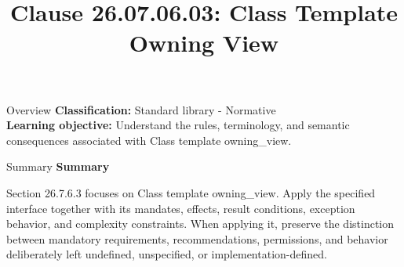 \documentclass[10pt,letterpaper]{article}
\title{Clause 26.07.06.03: Class Template Owning View}
\author{}
\date{}
\begin{document}
\maketitle
\begin{CornellOverviewBox}{Overview}
\textbf{Classification:} Standard library - Normative\\[2pt]
\textbf{Learning objective:} Understand the rules, terminology, and semantic consequences associated with Class template owning\_view.
\end{CornellOverviewBox}\begin{CornellSummaryBox}{Summary}
{\sffamily\bfseries\color{Accent} Summary}\par\vspace{3pt}Section 26.7.6.3 focuses on Class template owning\_view. Apply the specified interface together with its mandates, effects, result conditions, exception behavior, and complexity constraints. When applying it, preserve the distinction between mandatory requirements, recommendations, permissions, and behavior deliberately left undefined, unspecified, or implementation-defined.
\end{CornellSummaryBox}
\end{document}
